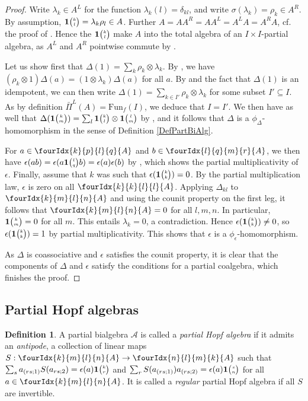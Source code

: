 \documentclass[10pt]{article}
\newcommand{\Fun}{\mathrm{Fun}}
\newcommand{\Grt}[3]{#1{\tiny {\begin{pmatrix} #2\\#3\end{pmatrix}}}}
\newcommand{\UnitC}[2]{\Grt{\mathbf{1}}{#1}{#2}}
\newcommand{\Gr}[5]{\fourIdx{#2}{#4}{#3}{#5}{#1}}%
\theoremstyle{definition}
\newtheorem{Def}[Theorem]{Definition}
\numberwithin{equation}{section}
\begin{document}
\begin{proof} Write $\lambda_k \in A^L$ for the function $\lambda_k(l) = \delta_{kl}$, and write $\sigma(\lambda_k) = \rho_k\in A^R$. By assumption, $\UnitC{k}{l} = \lambda_k\rho_l\in A$. Further $A= AA^R = AA^L = A^LA=A^RA$, cf.~ the proof of \cite[Theorem 3.13]{Boh1}. Hence the $\UnitC{k}{l}$ make $A$ into the total algebra of an $I\times I$-partial algebra, as $A^L$ and $A^R$ pointwise commute by \cite[Lemma 3.5]{Boh1}. 

Let us show first that $\Delta(1) = \sum_k \rho_k\otimes \lambda_k$. By \cite[Lemma 3.9]{Boh1}, we have $(\rho_k\otimes 1)\Delta(a) = (1\otimes \lambda_k)\Delta(a)$ for all $a$. By \cite[Lemma 4.10]{Boh1} and the fact that $\Delta(1)$ is an idempotent, we can then write $\Delta(1)=\sum_{k\in I'} \rho_k\otimes \lambda_k$ for some subset $I'\subseteq I$. As by definition $\bar{\Pi}^L(A) = \Fun_{f}(I)$, we deduce that $I=I'$. We then have as well that $\Delta(\UnitC{k}{m}) = \sum_l \UnitC{k}{l}\otimes \UnitC{l}{m}$ by \cite[Lemma 3.3]{Boh1}, and it follows that $\Delta$ is a $\phi_{\Delta}$-homomorphism in the sense of Definition \ref{DefPartBiAlg}.

For $a\in \Gr{A}{k}{l}{p}{q}$ and $b\in \Gr{A}{l}{m}{q}{r}$, we then have $\epsilon(ab) = \epsilon(a\UnitC{l}{q}b) = \epsilon(a)\epsilon(b)$ by \cite[Proposition 2.6.(4)]{Boh1}, which shows the partial multiplicativity of $\epsilon$. Finally, assume that $k$ was such that $\epsilon(\UnitC{k}{k})=0$. By the partial multiplication law, $\epsilon$ is zero on all $\Gr{A}{k}{l}{k}{l}$. Applying $\Delta_{kl}$ to $\Gr{A}{k}{l}{m}{n}$ and using the counit property on the first leg, it follows that $\Gr{A}{k}{l}{m}{n}=0$ for all $l,m,n$. In particular, $\UnitC{k}{m}=0$ for all $m$. This entails $\lambda_k=0$, a contradiction. Hence $\epsilon(\UnitC{k}{k})\neq 0$, so $\epsilon(\UnitC{k}{k})=1$ by partial multiplicativity. This shows that $\epsilon$ is a $\phi_{\epsilon}$-homomorphism.

As $\Delta$ is coassociative and $\epsilon$ satisfies the counit property, it is clear that the components of $\Delta$ and $\epsilon$ satisfy the conditions for a partial coalgebra, which finishes the proof.
\end{proof} 

\subsection{Partial Hopf algebras}

\begin{Def}\label{DefPartBiAlgAnt}A partial bialgebra $\mathscr{A}$ is called a \emph{partial Hopf algebra} if it admits an \emph{antipode}, a collection of linear
maps $S:\Gr{A}{k}{l}{m}{n}\rightarrow \Gr{A}{n}{m}{l}{k}$ such that $\sum_s a_{(rs;1)}S(a_{rs;2})= \epsilon(a)\UnitC{k}{r}$ and $\sum_r S(a_{(rs;1)})a_{(rs;2)}= \epsilon(a)\UnitC{s}{n}$ for all $a \in \Gr{A}{k}{l}{m}{n}$. It is called a \emph{regular} partial Hopf algebra if all $S$ are invertible.
\end{Def} 
\end{document}
